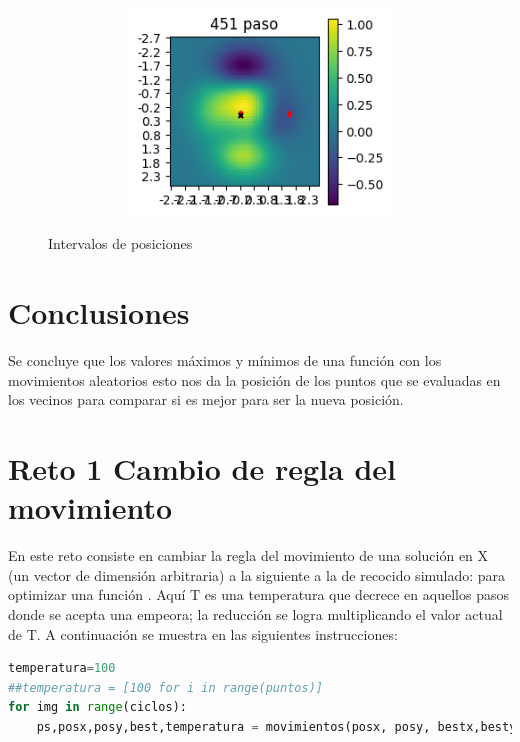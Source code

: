 \documentclass{article}
\begin{document}
\begin{figure}
\begin{subfigure}[b]{0.40\textwidth}
\begin{subfigure}[b]{0.40\textwidth}
         \includegraphics[width=\textwidth]{p7p_450.png}
         \caption{}
         \label{fig:tocan}
     \end{subfigure}
     \end{subfigure}
     \caption{Intervalos de posiciones}
      \label{semilla}
\end{figure}

\newpage

\section{Conclusiones}\label{}
Se concluye que los valores máximos y mínimos de una función con los movimientos aleatorios esto nos da la posición de los puntos que se evaluadas en los vecinos para comparar si es mejor para ser la nueva posición.

\newpage
\section{Reto 1 Cambio de regla del movimiento}\label{}
En este reto consiste en cambiar la regla del movimiento de una solución en X (un vector de dimensión arbitraria) a la siguiente a la de recocido simulado: para optimizar una función \cite{elisa1}. Aquí T es una temperatura que decrece en aquellos pasos donde se acepta una empeora; la reducción se logra multiplicando el valor actual de T. A continuación se muestra en las siguientes instrucciones: 

\begin{lstlisting}[caption=Temperatura, language=Python]
temperatura=100
##temperatura = [100 for i in range(puntos)]
for img in range(ciclos):
    ps,posx,posy,best,temperatura = movimientos(posx, posy, bestx,besty, temperatura)
\end{lstlisting}
\end{document}
